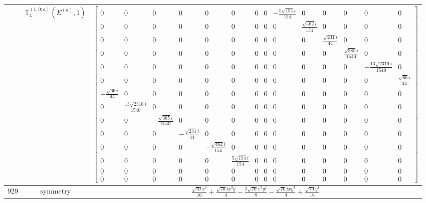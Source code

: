 \documentclass[fleqn,8pt,landscape]{jsarticle}
\begin{document}
\begin{longtable}{ccc}
$  $ & $ \mathbb{T}_{4}^{(1,0;a)}(E^{(a)},1) $ & $ \begin{bmatrix} 0 & 0 & 0 & 0 & 0 & 0 & 0 & 0 & - \frac{5 \sqrt{154} i}{154} & 0 & 0 & 0 & 0 & 0 \\ 0 & 0 & 0 & 0 & 0 & 0 & 0 & 0 & 0 & \frac{\sqrt{462} i}{154} & 0 & 0 & 0 & 0 \\ 0 & 0 & 0 & 0 & 0 & 0 & 0 & 0 & 0 & 0 & \frac{\sqrt{231} i}{44} & 0 & 0 & 0 \\ 0 & 0 & 0 & 0 & 0 & 0 & 0 & 0 & 0 & 0 & 0 & \frac{\sqrt{385} i}{1540} & 0 & 0 \\ 0 & 0 & 0 & 0 & 0 & 0 & 0 & 0 & 0 & 0 & 0 & 0 & - \frac{13 \sqrt{2310} i}{1540} & 0 \\ 0 & 0 & 0 & 0 & 0 & 0 & 0 & 0 & 0 & 0 & 0 & 0 & 0 & \frac{\sqrt{66} i}{44} \\ - \frac{\sqrt{66} i}{44} & 0 & 0 & 0 & 0 & 0 & 0 & 0 & 0 & 0 & 0 & 0 & 0 & 0 \\ 0 & \frac{13 \sqrt{2310} i}{1540} & 0 & 0 & 0 & 0 & 0 & 0 & 0 & 0 & 0 & 0 & 0 & 0 \\ 0 & 0 & - \frac{\sqrt{385} i}{1540} & 0 & 0 & 0 & 0 & 0 & 0 & 0 & 0 & 0 & 0 & 0 \\ 0 & 0 & 0 & - \frac{\sqrt{231} i}{44} & 0 & 0 & 0 & 0 & 0 & 0 & 0 & 0 & 0 & 0 \\ 0 & 0 & 0 & 0 & - \frac{\sqrt{462} i}{154} & 0 & 0 & 0 & 0 & 0 & 0 & 0 & 0 & 0 \\ 0 & 0 & 0 & 0 & 0 & \frac{5 \sqrt{154} i}{154} & 0 & 0 & 0 & 0 & 0 & 0 & 0 & 0 \\ 0 & 0 & 0 & 0 & 0 & 0 & 0 & 0 & 0 & 0 & 0 & 0 & 0 & 0 \\ 0 & 0 & 0 & 0 & 0 & 0 & 0 & 0 & 0 & 0 & 0 & 0 & 0 & 0 \end{bmatrix} $ \\ \hline
$ 929 $ & $ \text{symmetry} $ & $ \frac{\sqrt{70} x^{4}}{16} + \frac{\sqrt{70} i x^{3} y}{4} - \frac{3 \sqrt{70} x^{2} y^{2}}{8} - \frac{\sqrt{70} i x y^{3}}{4} + \frac{\sqrt{70} y^{4}}{16} $ \\

\end{longtable}
\end{document}
